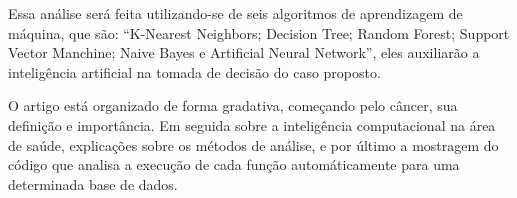 Essa análise será feita utilizando-se de seis algoritmos de aprendizagem de máquina, que são: “K-Nearest Neighbors;
Decision Tree; Random Forest; Support Vector Manchine; Naive Bayes e Artificial Neural Network”, eles auxiliarão a inteligência artificial na tomada de decisão do caso proposto.

O artigo está organizado de forma gradativa, começando pelo câncer,
sua definição e importância.
Em seguida sobre a inteligência computacional na área de saúde,
explicações sobre os métodos de análise,
e por último a mostragem do código que analisa a execução de cada função
automáticamente para uma determinada base de dados.

















